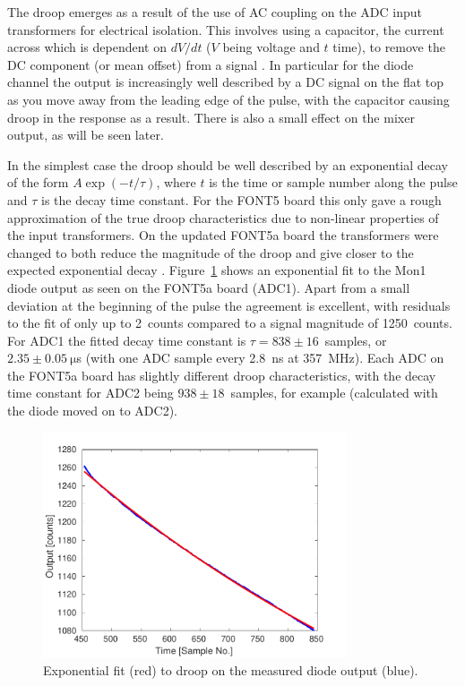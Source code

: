 The droop emerges as a result of the use of AC coupling on the ADC input transformers for electrical isolation. This involves using a capacitor, the current across which is dependent on \({dV}/{dt}\) (\(V\) being voltage and \(t\) time), to remove the DC component (or mean offset) from a signal \cite{acCoupling}. In particular for the diode channel the output is increasingly well described by a DC signal on the flat top as you move away from the leading edge of the pulse, with the capacitor causing droop in the response as a result. There is also a small effect on the mixer output, as will be seen later.

In the simplest case the droop should be well described by an exponential decay of the form \(A\exp\left(-t/\tau\right)\), where \(t\) is the time or sample number along the pulse and \(\tau\) is the decay time constant. For the FONT5 board this only gave a rough approximation of the true droop characteristics due to non-linear properties of the input transformers. On the updated FONT5a board the transformers were changed to both reduce the magnitude of the droop and give closer to the expected exponential decay \cite{colinPriv}. Figure~\ref{f:iirDiodeFit} shows an exponential fit to the Mon1 diode output as seen on the FONT5a board (ADC1). Apart from a small deviation at the beginning of the pulse the agreement is excellent, with residuals to the fit of only up to 2~counts compared to a signal magnitude of 1250~counts. For ADC1 the fitted decay time constant is \(\tau = 838\pm16\)~samples, or \(2.35\pm0.05~\mathrm{\mu}\)s (with one ADC sample every 2.8~ns at 357~MHz). Each ADC on the FONT5a board has slightly different droop characteristics, with the decay time constant for ADC2 being \(938\pm18\)~samples, for example (calculated with the diode moved on to ADC2).

\begin{figure}
  \centering
  \includegraphics[width=0.8\textwidth]{Figures/commissioning/iirDiodeFit}
  \caption{Exponential fit (red) to droop on the measured diode output (blue).}
  \label{f:iirDiodeFit}
\end{figure}

